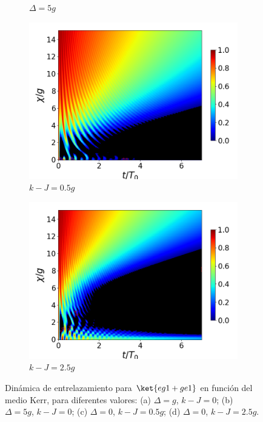 \begin{figure}[h!]
\begin{subfigure}{0.49\textwidth}
        \caption{$\Delta=5g$}
        \label{fig4:concu x 1 d2}
    \end{subfigure}
    \vfill
    \begin{subfigure}{0.49\textwidth}
        \includegraphics[width=\textwidth]{figuras/ch4/concu/chi/eg1+ge1 d=0.0g k=0.5g J=0.0g gamma=0.25g concu chi dis.png}
        \caption{$k-J=0.5g$}
        \label{fig4:concu x 1 k1}
    \end{subfigure}
    \hfill
    \begin{subfigure}{0.49\textwidth}
        \includegraphics[width=\textwidth]{figuras/ch4/concu/chi/eg1+ge1 d=0.0g k=2.5g J=0.0g gamma=0.25g concu chi dis.png}
        \caption{$k-J=2.5g$}
        \label{fig4:concu x 1 k2}
    \end{subfigure}
    \caption{Dinámica de entrelazamiento para $\ket{eg1+ge1}$ en función del medio Kerr, para diferentes valores: (a) $\Delta=g$, $k-J=0$; (b) $\Delta=5g$, $k-J=0$; (c) $\Delta=0$, $k-J=0.5g$; (d) $\Delta=0$, $k-J=2.5g$.}
    \label{fig4:concu x params 1}
\end{figure}
